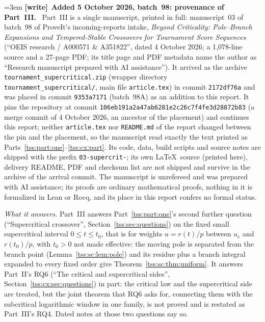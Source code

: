 \documentclass[11pt]{article}
\theoremstyle{remark}\newtheorem{remark}[theorem]{Remark}
\theoremstyle{definition}\newtheorem{definition}[theorem]{Definition}
\newenvironment{writenote}[1][]{\par\smallskip\begingroup\small\emergencystretch=3em
 \noindent\textbf{[write]}\if\relax\detokenize{#1}\relax\else~\textbf{#1.}\fi\ }%
 {\par\endgroup\smallskip}
\begin{document}
\begin{writenote}[Added 5 October 2026, batch~98: provenance of Part~III]
Part~III is a single manuscript, printed in full: manuscript~03 of batch~98
of ProveIt's incoming-reports intake, \emph{Beyond Criticality: Pole--Branch
Expansions and Tempered-Stable Crossovers for Tournament Score Sequences}
(``OEIS research / A000571 \& A351822'', dated 4 October 2026; a
1{,}078-line source and a 27-page PDF; its title page and PDF metadata name
the author as ``Research manuscript prepared with AI assistance''). It
arrived as the archive
\texttt{tournament\_\allowbreak supercritical.zip} (wrapper directory
\texttt{tournament\_\allowbreak supercritical/}, main file
\texttt{article.tex}) in commit \texttt{2172df76a} and was placed in commit
\texttt{9353a7171} (batch~98A) as an addition to this report. It pins the
repository at commit \texttt{106eb191a2a47ab6281e2c26c7f4fe3d28872b83} (a
merge commit of 4 October 2026, an ancestor of the placement) and continues
this report; neither \texttt{article.tex} nor \texttt{README.md} of the
report changed between the pin and the placement, so the manuscript read
exactly the text printed as Parts~\ref{tss:part:one}--\ref{tss:cx:part}.
Its code, data, build scripts and source notes are shipped with the prefix
\texttt{03-supercrit-}; its own \LaTeX\ source (printed here), delivery
README, PDF and checksum list are not shipped and survive in the archive of
the arrival commit. The manuscript is unrefereed and was prepared with AI
assistance; its proofs are ordinary mathematical proofs, nothing in it is
formalized in Lean or Rocq, and its place in this report confers no formal
status.

\emph{What it answers.} Part~III answers Part~\ref{tss:part:one}'s second
further question (``Supercritical crossover'',
Section~\ref{tss:sec:questions}) on the fixed small supercritical interval
$0\le t\le t_0$, that is for weights $u=r(t)/p$ between $u_c$ and
$r(t_0)/p$, with $t_0>0$ not made effective: the moving pole is separated
from the branch point (Lemma~\ref{tss:sc:lem:pole}) and its residue plus a
branch integral expanded to every fixed order give
Theorem~\ref{tss:sc:thm:uniform}. It answers Part~II's RQ6 (``The critical
and supercritical sides'', Section~\ref{tss:cx:sec:questions}) in part: the
critical law and the supercritical side are treated, but the joint theorem
that RQ6 asks for, connecting them with the subcritical logarithmic window
in one family, is not proved and is restated as Part~III's RQ4. Dated
notes at those two questions say so.


\end{writenote}
\end{document}
